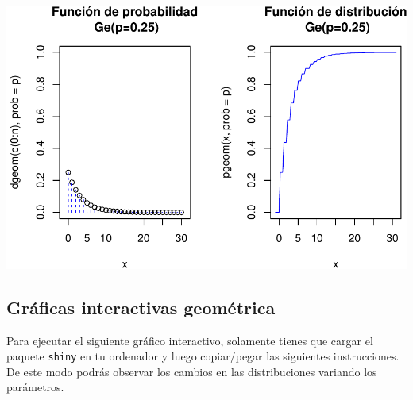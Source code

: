 \documentclass[]{book}
\begin{document}
\begin{center}\includegraphics{curso-probabilidad-udemy_files/figure-latex/graficos22-1} \end{center}

\hypertarget{gruxe1ficas-interactivas-geomuxe9trica}{%
\subsection{Gráficas interactivas geométrica}\label{gruxe1ficas-interactivas-geomuxe9trica}}

Para ejecutar el siguiente gráfico interactivo, solamente tienes que cargar el paquete \texttt{shiny} en tu ordenador y luego copiar/pegar las siguientes instrucciones. De este modo podrás observar los cambios en las distribuciones variando los parámetros.
\end{document}
